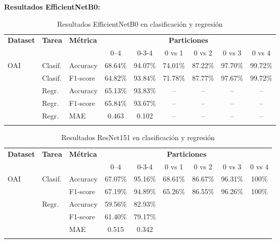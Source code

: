 \documentclass[11pt,spanish,listoffigures,listoftables]{tfgetsinf}
\begin{document}
\textbf{Resultados EfficientNetB0:}
\begin{table}[h]
    \centering
    \caption{Resultados EfficientNetB0 en clasificación y regresión}
    \label{tab:cnn_grande_results}
    \begin{tabular}{@{} l l l c c c c c c @{}} 
      \toprule
      \textbf{Dataset} & \textbf{Tarea} & \textbf{Métrica} 
        & \multicolumn{6}{c}{\textbf{Particiones}} \\
      \cmidrule(lr){4-9}
      & & & 0--4 & 0-3-4 & 0 vs 1 & 0 vs 2 & 0 vs 3 & 0 vs 4 \\
      \midrule
      \multirow{2}{*}{OAI}
        & Clasif. & Accuracy   & 68.64\% & 94.07\% & 74.01\% & 87.22\% & 97.70\% & 99.72\% \\
        & Clasif. & F1-score   & 64.82\% & 93.84\% & 71.78\% & 87.77\% & 97.67\% & 99.72\% \\
      \addlinespace
      \multirow{3}{*}{OAI}
        & Regr.   & Accuracy   & 65.13\% & 93.83\% & -- & -- & -- & -- \\
        & Regr.   & F1-score   & 65.84\% & 93.67\% & -- & -- & -- & -- \\
        & Regr.   & MAE        & 0.463   & 0.102   & -- & -- & -- & -- \\
      \addlinespace
    \end{tabular}
\end{table}

\begin{table}[h]
    \centering
    \caption{Resultados ResNet151 en clasificación y regresión}
    \label{tab:cnn_grande_results}
    \begin{tabular}{@{} l l l c c c c c c @{}} 
      \toprule
      \textbf{Dataset} & \textbf{Tarea} & \textbf{Métrica} 
        & \multicolumn{6}{c}{\textbf{Particiones}} \\
      \cmidrule(lr){4-9}
      & & & 0--4 & 0-3-4 & 0 vs 1 & 0 vs 2 & 0 vs 3 & 0 vs 4 \\
      \midrule
      \multirow{2}{*}{OAI}
        & Clasif. & Accuracy   & 67.07\% & 95.16\% & 68.61\% & 86.67\% & 96.31\% & 100\% \\
        &         & F1-score   & 67.19\% & 94.89\% & 65.26\% & 86.55\% & 96.26\% & 100\% \\
      \addlinespace
      \multirow{3}{*}{OAI}
        & Regr.   & Accuracy   & 59.56\% & 82.93\% &  &  &  &  \\
        &         & F1-score   & 61.40\% & 79.17\% &  &  &  &  \\
        &         & MAE        & 0.515   & 0.342 &  &  &  &  \\
      \addlinespace
    \end{tabular}
\end{table}
\end{document}
